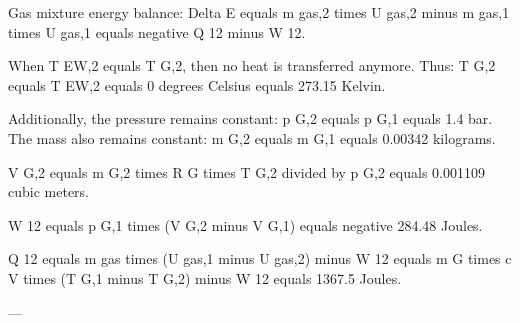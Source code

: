 Gas mixture energy balance:  
Delta E equals m gas,2 times U gas,2 minus m gas,1 times U gas,1 equals negative Q 12 minus W 12.  

When T EW,2 equals T G,2, then no heat is transferred anymore.  
Thus: T G,2 equals T EW,2 equals 0 degrees Celsius equals 273.15 Kelvin.  

Additionally, the pressure remains constant: p G,2 equals p G,1 equals 1.4 bar.  
The mass also remains constant: m G,2 equals m G,1 equals 0.00342 kilograms.  

V G,2 equals m G,2 times R G times T G,2 divided by p G,2 equals 0.001109 cubic meters.  

W 12 equals p G,1 times (V G,2 minus V G,1) equals negative 284.48 Joules.  

Q 12 equals m gas times (U gas,1 minus U gas,2) minus W 12 equals m G times c V times (T G,1 minus T G,2) minus W 12 equals 1367.5 Joules.  

---